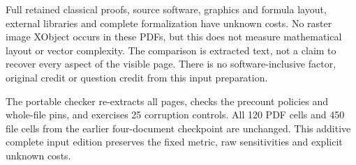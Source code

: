 \documentclass[11pt]{article}
\begin{document}
Full retained classical proofs, source software, graphics and formula layout,
external libraries and complete formalization have unknown costs. No raster
image XObject occurs in these PDFs, but this does not measure mathematical
layout or vector complexity. The comparison is extracted text, not a claim
to recover every aspect of the visible page. There is no software-inclusive
factor, original credit or question credit from this input preparation.

The portable checker re-extracts all pages, checks the precount policies and
whole-file pins, and exercises 25 corruption controls. All 120 PDF cells and 450 file cells from the earlier
four-document checkpoint are unchanged. This additive complete input edition
preserves the fixed metric, raw sensitivities and explicit unknown costs.
\end{document}

